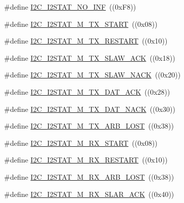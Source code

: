 \begin{DoxyCompactItemize}
\#define \hyperlink{group___i2_c___private___macros_ga3e2ecdeb466041bb3cf435ccf36564d9}{\-I2\-C\-\_\-\-I2\-S\-T\-A\-T\-\_\-\-N\-O\-\_\-\-I\-N\-F}~((0x\-F8))
\item 
\#define \hyperlink{group___i2_c___private___macros_ga5c44c05176052f6040cd40d680bc2a91}{\-I2\-C\-\_\-\-I2\-S\-T\-A\-T\-\_\-\-M\-\_\-\-T\-X\-\_\-\-S\-T\-A\-R\-T}~((0x08))
\item 
\#define \hyperlink{group___i2_c___private___macros_gad41d0d1392b7d905b22b9c5015f2e48f}{\-I2\-C\-\_\-\-I2\-S\-T\-A\-T\-\_\-\-M\-\_\-\-T\-X\-\_\-\-R\-E\-S\-T\-A\-R\-T}~((0x10))
\item 
\#define \hyperlink{group___i2_c___private___macros_gab91c158252efeb1a3a139faec3622ae0}{\-I2\-C\-\_\-\-I2\-S\-T\-A\-T\-\_\-\-M\-\_\-\-T\-X\-\_\-\-S\-L\-A\-W\-\_\-\-A\-C\-K}~((0x18))
\item 
\#define \hyperlink{group___i2_c___private___macros_ga15729d9436fbf4c23a22e7cdbc913552}{\-I2\-C\-\_\-\-I2\-S\-T\-A\-T\-\_\-\-M\-\_\-\-T\-X\-\_\-\-S\-L\-A\-W\-\_\-\-N\-A\-C\-K}~((0x20))
\item 
\#define \hyperlink{group___i2_c___private___macros_gad8c325e3c58aa8e7810797b9a6761596}{\-I2\-C\-\_\-\-I2\-S\-T\-A\-T\-\_\-\-M\-\_\-\-T\-X\-\_\-\-D\-A\-T\-\_\-\-A\-C\-K}~((0x28))
\item 
\#define \hyperlink{group___i2_c___private___macros_ga234f86990a6fd63f1d2064cbca4709a3}{\-I2\-C\-\_\-\-I2\-S\-T\-A\-T\-\_\-\-M\-\_\-\-T\-X\-\_\-\-D\-A\-T\-\_\-\-N\-A\-C\-K}~((0x30))
\item 
\#define \hyperlink{group___i2_c___private___macros_ga79230136402441c7e233c63fd2f71bdf}{\-I2\-C\-\_\-\-I2\-S\-T\-A\-T\-\_\-\-M\-\_\-\-T\-X\-\_\-\-A\-R\-B\-\_\-\-L\-O\-S\-T}~((0x38))
\item 
\#define \hyperlink{group___i2_c___private___macros_gab1f79137c62e306269633b005ad936da}{\-I2\-C\-\_\-\-I2\-S\-T\-A\-T\-\_\-\-M\-\_\-\-R\-X\-\_\-\-S\-T\-A\-R\-T}~((0x08))
\item 
\#define \hyperlink{group___i2_c___private___macros_gacb1c9145acd64a77464017f1dd9279c5}{\-I2\-C\-\_\-\-I2\-S\-T\-A\-T\-\_\-\-M\-\_\-\-R\-X\-\_\-\-R\-E\-S\-T\-A\-R\-T}~((0x10))
\item 
\#define \hyperlink{group___i2_c___private___macros_gaed32dea40cf84a1efb09e0c389579163}{\-I2\-C\-\_\-\-I2\-S\-T\-A\-T\-\_\-\-M\-\_\-\-R\-X\-\_\-\-A\-R\-B\-\_\-\-L\-O\-S\-T}~((0x38))
\item 
\#define \hyperlink{group___i2_c___private___macros_gacd29e4a94f8a533477dbbf026c0d525a}{\-I2\-C\-\_\-\-I2\-S\-T\-A\-T\-\_\-\-M\-\_\-\-R\-X\-\_\-\-S\-L\-A\-R\-\_\-\-A\-C\-K}~((0x40))

\end{DoxyCompactItemize}
